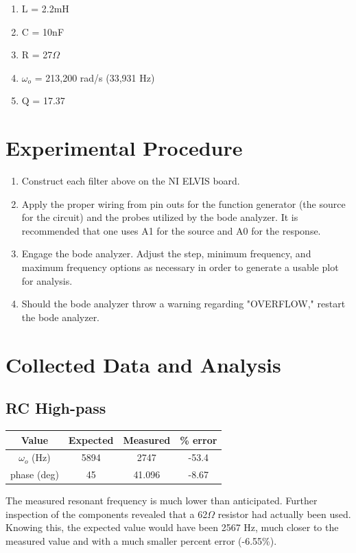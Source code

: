 \documentclass[journal]{IEEEtran}
\begin{document}
\begin{enumerate}
\item
L = 2.2mH
\item
C = 10nF
\item
R = 27$\Omega$
\item
$\omega_{o}$ = 213,200 rad/s (33,931 Hz)
\item
Q = 17.37
\end{enumerate}

\section{Experimental Procedure}

\begin{enumerate}
\item
Construct each filter above on the NI ELVIS board.
\item
Apply the proper wiring from pin outs for the function generator (the source for the circuit) and the probes utilized by the bode analyzer. It is recommended that one uses A1 for the source and A0 for the response.
\item
Engage the bode analyzer. Adjust the step, minimum frequency, and maximum frequency options as necessary in order to generate a usable plot for analysis.
\item
Should the bode analyzer throw a warning regarding "OVERFLOW," restart the bode analyzer.
\end{enumerate}

\section{Collected Data and Analysis}

\subsection{RC High-pass}


\begin{tabular}{|c|c|c|c|}
\hline
Value & Expected & Measured & \% error \\
\hline
$\omega_{o}$ (Hz) & 5894 & 2747 & -53.4\\
\hline
phase (deg) & 45 & 41.096 & -8.67\\
\hline
\end{tabular}

The measured resonant frequency is much lower than anticipated. Further inspection of the components revealed that a 62$\Omega$ resistor had actually been used. Knowing this, the expected value would have been 2567 Hz, much closer to the measured value and with a much smaller percent error (-6.55\%).
\end{document}
